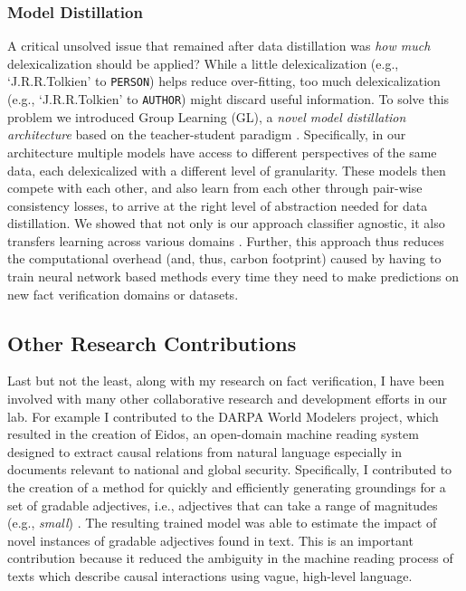 \documentclass[10pt]{article}
\begin{document}
 
\subsubsection{Model Distillation} 



 A critical unsolved issue that remained after data distillation was \textit{how much} delexicalization should be applied?
 While a little delexicalization (e.g., `J.R.R.Tolkien' to \texttt{PERSON}) helps reduce over-fitting, too much delexicalization (e.g., `J.R.R.Tolkien' to \texttt{AUTHOR}) might discard useful information. To solve this problem we introduced Group Learning (GL), a \textit{novel model distillation architecture} based on the
 teacher-student paradigm \cite{hinton2015distilling}.
 Specifically, in our architecture multiple models have access to different perspectives of the same data, each delexicalized with a different level of granularity. These models then compete with each other, and also learn from each other through pair-wise consistency losses, to arrive at the right level of abstraction needed for data distillation. We showed that not only is our approach classifier agnostic, it also transfers learning across various domains \cite{mithun2021data}. Further, this approach thus reduces the computational overhead (and, thus, carbon footprint) caused by having to train neural network based methods every time they need to make predictions on new fact verification domains or datasets.
 
\subsection{Other Research Contributions }

Last but not the least, along with my research on fact verification, I have been involved with many other collaborative research and development efforts in our lab. For example I contributed to the DARPA World Modelers project, which resulted in the creation of Eidos, an open-domain
machine reading system designed to extract
causal relations from natural language especially in documents relevant to national and global security. Specifically, I contributed to the creation of a method for quickly and efficiently generating groundings for a set of gradable adjectives, i.e., adjectives that can take a range of magnitudes (e.g., \textit{small}) \cite{sharp2018grounding}. The resulting trained model was able to estimate the impact of novel instances of gradable adjectives found in text. This is an important contribution because it reduced the ambiguity in the machine reading process of texts which describe causal interactions using vague, high-level language. 
\end{document}
